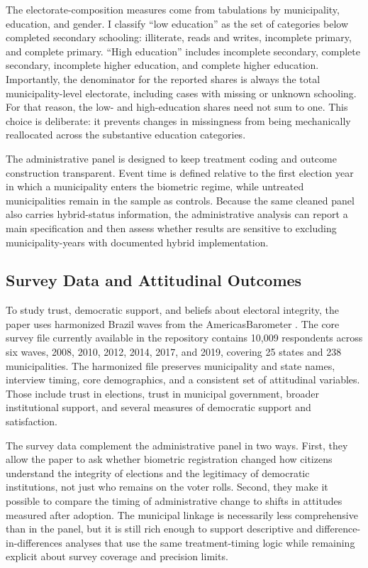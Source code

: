 The electorate-composition measures come from \TSE{} tabulations by municipality, education, and gender. I classify ``low education'' as the set of categories below completed secondary schooling: illiterate, reads and writes, incomplete primary, and complete primary. ``High education'' includes incomplete secondary, complete secondary, incomplete higher education, and complete higher education. Importantly, the denominator for the reported shares is always the total municipality-level electorate, including cases with missing or unknown schooling. For that reason, the low- and high-education shares need not sum to one. This choice is deliberate: it prevents changes in missingness from being mechanically reallocated across the substantive education categories.

The administrative panel is designed to keep treatment coding and outcome construction transparent. Event time is defined relative to the first election year in which a municipality enters the biometric regime, while untreated municipalities remain in the sample as controls. Because the same cleaned panel also carries hybrid-status information, the administrative analysis can report a main specification and then assess whether results are sensitive to excluding municipality-years with documented hybrid implementation.

\subsection{Survey Data and Attitudinal Outcomes}

To study trust, democratic support, and beliefs about electoral integrity, the paper uses harmonized Brazil waves from the \LAPOP{} AmericasBarometer \citep{lapop_americasbarometer}. The core survey file currently available in the repository contains 10,009 respondents across six waves, 2008, 2010, 2012, 2014, 2017, and 2019, covering 25 states and 238 municipalities. The harmonized file preserves municipality and state names, interview timing, core demographics, and a consistent set of attitudinal variables. Those include trust in elections, trust in municipal government, broader institutional support, and several measures of democratic support and satisfaction.

The survey data complement the administrative panel in two ways. First, they allow the paper to ask whether biometric registration changed how citizens understand the integrity of elections and the legitimacy of democratic institutions, not just who remains on the voter rolls. Second, they make it possible to compare the timing of administrative change to shifts in attitudes measured after adoption. The municipal linkage is necessarily less comprehensive than in the \TSE{} panel, but it is still rich enough to support descriptive and difference-in-differences analyses that use the same treatment-timing logic while remaining explicit about survey coverage and precision limits.

